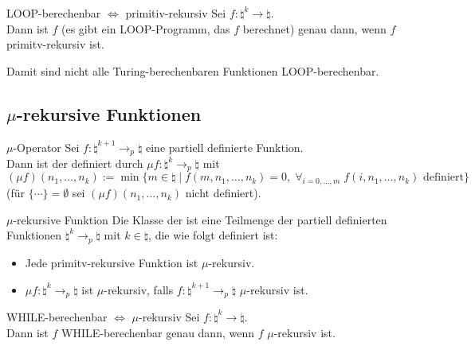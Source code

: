 \begin{Satz}{LOOP-berechenbar $\iff$ primitiv-rekursiv}
    Sei $f\colon \natural^k \rightarrow \natural$.\\
    Dann ist $f$  (es gibt ein LOOP-Programm, das $f$ berechnet)
    genau dann, wenn $f$ primitv-rekursiv ist.
\end{Satz}

\begin{Bem}
    Damit sind nicht alle Turing-berechenbaren Funktionen LOOP-berechenbar.
\end{Bem}

\subsection{%
    \texorpdfstring{$\mu$}{µ}-rekursive Funktionen%
}

\begin{Def}{$\mu$-Operator}
    Sei $f\colon \natural^{k+1} \rightarrow_p \natural$ eine partiell definierte Funktion.\\
    Dann ist der  definiert durch
    $\mu f\colon \natural^k \rightarrow_p \natural$ mit\\
    $(\mu f)(n_1, \dotsc, n_k) := \min\{m \in \natural \;|\; f(m, n_1, \dotsc, n_k) = 0,\;
    \forall_{i = 0, \dotsc, m}\; f(i, n_1, \dotsc, n_k) \text{ definiert}\}$\\
    (für $\{\dotsb\} = \emptyset$ sei $(\mu f)(n_1, \dotsc, n_k)$ nicht definiert).
\end{Def}

\begin{Def}{$\mu$-rekursive Funktion}
    Die Klasse der  ist eine Teilmenge der partiell
    definierten Funktionen $\natural^k \rightarrow_p \natural$ mit $k \in \natural$,
    die wie folgt definiert ist:
    \begin{itemize}
        \item
        Jede primitv-rekursive Funktion ist $\mu$-rekursiv.

        \item
        $\mu f\colon \natural^k \rightarrow_p \natural$ ist $\mu$-rekursiv,
        falls $f\colon \natural^{k+1} \rightarrow_p \natural$ $\mu$-rekursiv ist.
    \end{itemize}
\end{Def}

\begin{Satz}{WHILE-berechenbar $\iff$ $\mu$-rekursiv}
    Sei $f\colon \natural^k \rightarrow \natural$.\\
    Dann ist $f$ WHILE-berechenbar genau dann, wenn $f$ $\mu$-rekursiv ist.
\end{Satz}

